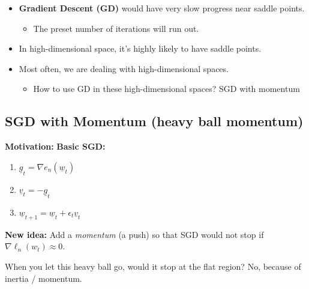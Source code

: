     \begin{intuition}
        \begin{itemize}
            \item \textbf{Gradient Descent (GD)} would have very slow progress near saddle points.
            \begin{itemize}
                \item The preset number of iterations will run out.
            \end{itemize}
            
            \item In high-dimensional space, it's highly likely to have saddle points.
            
            \item Most often, we are dealing with high-dimensional spaces.
            \begin{itemize}
                \item How to use GD in these high-dimensional spaces? SGD with momentum
            \end{itemize}
        \end{itemize}
    \end{intuition}

\subsection{SGD with Momentum (heavy ball momentum)}
    
    \begin{intuition} \textbf{Motivation:}
        \textbf{Basic SGD:} 
        \begin{enumerate}
            \item $\underline{g}_t = \nabla e_n(\underline{w}_t)$
            \item $\underline{v}_t = -\underline{g}_t$
            \item $\underline{w}_{t+1} = \underline{w}_t + \epsilon_t \underline{v}_t$
        \end{enumerate}

        \textbf{New idea:} Add a \textit{momentum} (a push) so that SGD would not stop if \( \nabla \ell_n(w_t) \approx 0 \).

        When you let this heavy ball go, would it stop at the flat region? No, because of inertia / momentum.

    \end{intuition}

